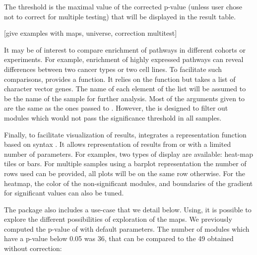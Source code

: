 \documentclass[article]{jss}
\begin{document}
The threshold is the maximal value of the corrected p-value (unless user chose not to correct for multiple testing) that will be displayed in the result table.

[give examples with maps, universe, correction multitest]

It may be of interest to compare enrichment of pathways in different cohorts or experiments. For example, enrichment of highly expressed pathways can reveal differences between two cancer types or two cell lines.
To facilitate such comparisons,  provides a  function. It relies on the  function but takes a list of character vector genes. The name of each element of the list will be assumed to be the name of the sample for further analysis.
Most of the arguments given to  are the same as the ones passed to . However, the  is designed to filter out modules which would not pass the significance threshold in all samples.   


Finally, to facilitate visualization of results,  integrates a
representation function based on  syntax \citep{ggplot2}. It
allows representation of results from  or
 with a limited number of parameters. For
examples, two types of display are available: heat-map tiles or bars. For
multiple samples using a barplot representation the number of rows used can be
provided, all plots will be on the same row otherwise. For the heatmap, the
color of the non-significant modules, and boundaries of the gradient for
significant values can also be tuned.

The package also includes a use-case that we detail below. Using,
 it is possible to explore the different possibilities of
exploration of the maps. We previously computed the p-value of
 with default parameters.  The number of modules which have a
p-value below 0.05 was 36, that can be compared to the 49 obtained without
correction: 
\end{document}
